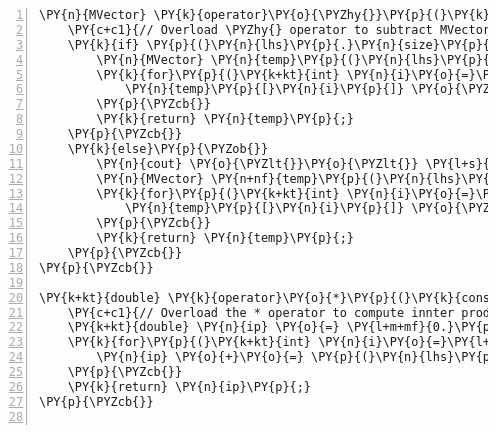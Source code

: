 \begin{Verbatim}[tabsize=2,commandchars=\\\{\},numbers=left,firstnumber=1,stepnumber=1]
\PY{n}{MVector} \PY{k}{operator}\PY{o}{\PYZhy{}}\PY{p}{(}\PY{k}{const} \PY{n}{MVector}\PY{o}{\PYZam{}} \PY{n}{lhs}\PY{p}{,} \PY{k}{const} \PY{n}{MVector}\PY{o}{\PYZam{}} \PY{n}{rhs}\PY{p}{)} \PY{p}{\PYZob{}}
	\PY{c+c1}{// Overload \PYZhy{} operator to subtract MVectors}
	\PY{k}{if} \PY{p}{(}\PY{n}{lhs}\PY{p}{.}\PY{n}{size}\PY{p}{(}\PY{p}{)} \PY{o}{=}\PY{o}{=} \PY{n}{rhs}\PY{p}{.}\PY{n}{size}\PY{p}{(}\PY{p}{)}\PY{p}{)}\PY{p}{\PYZob{}}
		\PY{n}{MVector} \PY{n}{temp}\PY{p}{(}\PY{n}{lhs}\PY{p}{)}\PY{p}{;}
		\PY{k}{for}\PY{p}{(}\PY{k+kt}{int} \PY{n}{i}\PY{o}{=}\PY{l+m+mi}{0}\PY{p}{;} \PY{n}{i}\PY{o}{\PYZlt{}}\PY{n}{temp}\PY{p}{.}\PY{n}{size}\PY{p}{(}\PY{p}{)}\PY{p}{;} \PY{n}{i}\PY{o}{+}\PY{o}{+}\PY{p}{)} \PY{p}{\PYZob{}}
			\PY{n}{temp}\PY{p}{[}\PY{n}{i}\PY{p}{]} \PY{o}{\PYZhy{}}\PY{o}{=} \PY{n}{rhs}\PY{p}{[}\PY{n}{i}\PY{p}{]}\PY{p}{;}
		\PY{p}{\PYZcb{}}
		\PY{k}{return} \PY{n}{temp}\PY{p}{;}
	\PY{p}{\PYZcb{}}
	\PY{k}{else}\PY{p}{\PYZob{}}
		\PY{n}{cout} \PY{o}{\PYZlt{}}\PY{o}{\PYZlt{}} \PY{l+s}{\PYZdq{}}\PY{l+s}{Warning: The vectors are of different sizes! This could be very bad.}\PY{l+s}{\PYZdq{}} \PY{o}{\PYZlt{}}\PY{o}{\PYZlt{}} \PY{n}{endl}\PY{p}{;}
		\PY{n}{MVector} \PY{n+nf}{temp}\PY{p}{(}\PY{n}{lhs}\PY{p}{)}\PY{p}{;}
		\PY{k}{for}\PY{p}{(}\PY{k+kt}{int} \PY{n}{i}\PY{o}{=}\PY{l+m+mi}{0}\PY{p}{;} \PY{n}{i}\PY{o}{\PYZlt{}}\PY{n}{temp}\PY{p}{.}\PY{n}{size}\PY{p}{(}\PY{p}{)}\PY{p}{;} \PY{n}{i}\PY{o}{+}\PY{o}{+}\PY{p}{)} \PY{p}{\PYZob{}}
			\PY{n}{temp}\PY{p}{[}\PY{n}{i}\PY{p}{]} \PY{o}{\PYZhy{}}\PY{o}{=} \PY{n}{rhs}\PY{p}{[}\PY{n}{i}\PY{p}{]}\PY{p}{;}
		\PY{p}{\PYZcb{}}
		\PY{k}{return} \PY{n}{temp}\PY{p}{;}
	\PY{p}{\PYZcb{}}
\PY{p}{\PYZcb{}}

\PY{k+kt}{double} \PY{k}{operator}\PY{o}{*}\PY{p}{(}\PY{k}{const} \PY{n}{MVector}\PY{o}{\PYZam{}} \PY{n}{lhs}\PY{p}{,} \PY{k}{const} \PY{n}{MVector}\PY{o}{\PYZam{}} \PY{n}{rhs}\PY{p}{)} \PY{p}{\PYZob{}}
	\PY{c+c1}{// Overload the * operator to compute innter product of MVectors}
	\PY{k+kt}{double} \PY{n}{ip} \PY{o}{=} \PY{l+m+mf}{0.}\PY{p}{;}
	\PY{k}{for}\PY{p}{(}\PY{k+kt}{int} \PY{n}{i}\PY{o}{=}\PY{l+m+mi}{0}\PY{p}{;} \PY{n}{i}\PY{o}{\PYZlt{}}\PY{n}{rhs}\PY{p}{.}\PY{n}{size}\PY{p}{(}\PY{p}{)}\PY{p}{;} \PY{n}{i}\PY{o}{+}\PY{o}{+}\PY{p}{)} \PY{p}{\PYZob{}}
		\PY{n}{ip} \PY{o}{+}\PY{o}{=} \PY{p}{(}\PY{n}{lhs}\PY{p}{[}\PY{n}{i}\PY{p}{]}\PY{o}{*}\PY{n}{rhs}\PY{p}{[}\PY{n}{i}\PY{p}{]}\PY{p}{)}\PY{p}{;}
	\PY{p}{\PYZcb{}}
	\PY{k}{return} \PY{n}{ip}\PY{p}{;}
\PY{p}{\PYZcb{}}


\end{Verbatim}
